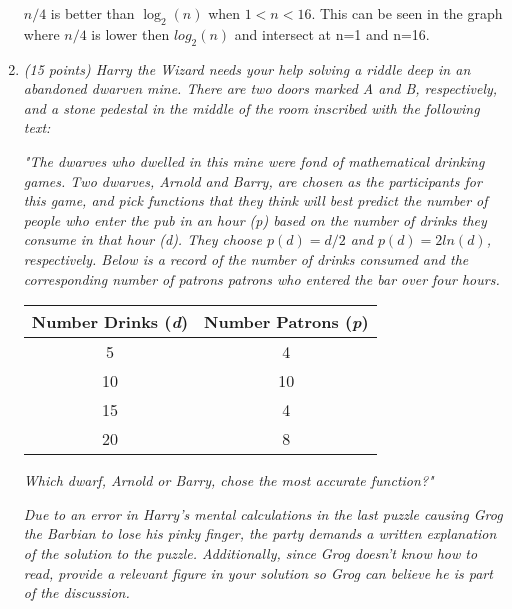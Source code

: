 \documentclass[12pt]{article}
\begin{document}
\begin{enumerate}

$n/4$ is better than $\log_2(n)$ when $1 < n < 16$. This can be seen in the graph where $n/4$ is lower then $log_2(n)$ and intersect at n=1 and n=16.


	\newpage

	\item \textit{(15 points) Harry the Wizard needs your help solving a riddle deep in an abandoned dwarven mine. There are two doors marked A and B, respectively, and a stone pedestal in the middle of the room inscribed with the following text:}

    \scriptsize

    \textit{"The dwarves who dwelled in  this mine were fond of mathematical drinking games. Two dwarves, Arnold and Barry, are chosen as the participants for this game, and pick functions that they think will best predict the number of people who enter the pub in an hour (\textit{p}) based on the number of drinks they consume in that hour (\textit{d}). They choose $p(d) = d/2$ and $p(d)= 2ln(d)$, respectively. Below is a record of the number of drinks consumed and the corresponding number of patrons patrons who entered the bar over four hours.}

    \begin{center}
        \begin{tabular}{|c | c |}
        \hline
        Number Drinks (\textit{d}) & Number Patrons (\textit{p})\\ \hline
        5 & 4  \\ \hline
        10 & 10  \\ \hline
        15 & 4  \\ \hline
        20 & 8  \\ \hline

        \end{tabular}
    \end{center}

    \textit{Which dwarf, Arnold or Barry, chose the most accurate function?"}

    \normalsize
    \textit{Due to an error in Harry's mental calculations in the last puzzle causing Grog the Barbian to lose his pinky finger, the party demands  a written explanation of the solution to the puzzle. Additionally, since Grog doesn't know how to read, provide a relevant figure in your solution so Grog can believe he is part of the discussion.}


\end{enumerate}
\end{document}
